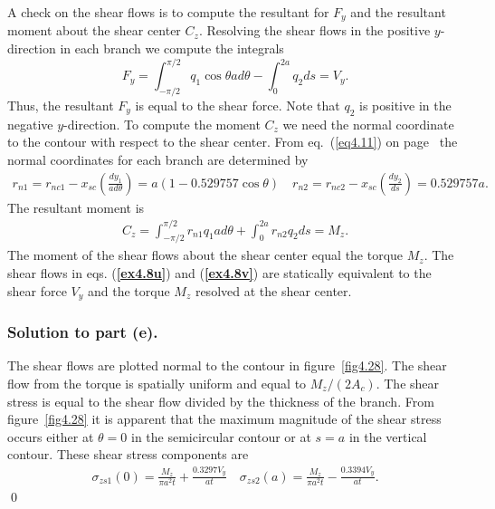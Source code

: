 \documentclass{AeroStructure-ERJohnson}
\begin{document}
\begin{example*}
A check on the shear flows is to compute the resultant for $F_{y}$ and the resultant moment about the shear center $C_{z}$. Resolving the shear flows in the positive $y$-direction in each branch we compute the integrals
\[
F_{y}=\int_{-\pi/2}^{\pi/2} q_{1} \cos \theta a d \theta-\int_{0}^{2a} q_{2} d s=V_{y}.
\]
Thus, the resultant $F_{y}$ is equal to the shear force. Note that  $q_2$  is positive in the negative $y$-direction. To compute the moment $C_{z}$ we need the normal coordinate to the contour with respect to the shear center. From eq.~(\ref{eq4.11}) on page~\pageref{eq4.11} the normal coordinates for each branch are determined by
\begin{align}\label{ex4.8w}
r_{n 1}=r_{n c 1}-x_{s c}\left(\frac{d y_{1}}{a d \theta}\right)=a(1-0.529757 \cos \theta) \quad r_{n 2}=r_{n c 2}-x_{s c}\left(\frac{d y_{2}}{d s}\right)=0.529757 a.
\end{align}
The resultant moment is
\begin{align}\label{ex4.8x}
C_{z}=\int_{-\pi/2}^{\pi/2} r_{n 1} q_{1} a d \theta+\int_{0}^{2a} r_{n 2} q_{2} d s=M_{z}.
\end{align}
The moment of the shear flows about the shear center equal the torque $M_{z}$. The shear flows in eqs. (\textbf{\ref{ex4.8u}}) and (\textbf{\ref{ex4.8v}}) are statically equivalent to the shear force $V_{y}$ and the torque $M_{z}$ resolved at the shear center.

\subsubsection{Solution to part (e).} The shear flows are plotted normal to the contour in figure~\ref{fig4.28}. The shear flow from the torque is spatially uniform and equal to $M_{z} /\left(2 A_{c}\right)$. The shear stress is equal to the shear flow divided by the thickness of the branch. From figure~\ref{fig4.28} it is apparent that the maximum magnitude of the shear stress occurs either at $\theta=0$ in the semicircular contour or at $s=a$ in the vertical contour. These shear stress components are
\begin{align}\sigma_{z s 1}(0)=\frac{M_{z}}{\pi a^{2} t}+\frac{0.3297 V_{y}}{a t} \quad \sigma_{z s 2}(a)=\frac{M_{z}}{\pi a^{2} t}-\frac{0.3394 V_{y}}{a t}.
\end{align}\hfill\qed
\end{example*}

\pagebreak
\end{document}
